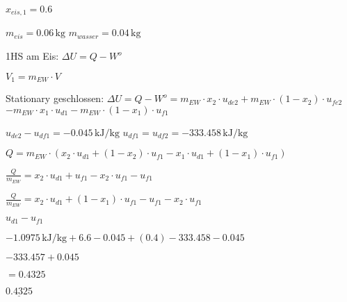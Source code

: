 \( x_{eis,1} = 0.6 \)  

\( m_{eis} = 0.06 \, \text{kg} \)  
\( m_{wasser} = 0.04 \, \text{kg} \)  

1HS am Eis:  
\( \Delta U = Q - W^o \)  

\( V_1 = m_{EW} \cdot V \)  

Stationary geschlossen:  
\( \Delta U = Q - W^o = m_{EW} \cdot x_2 \cdot u_{de2} + m_{EW} \cdot (1 - x_2) \cdot u_{fe2} \)  
\(- m_{EW} \cdot x_1 \cdot u_{d1} - m_{EW} \cdot (1 - x_1) \cdot u_{f1} \)  

\( u_{de2} - u_{df1} = -0.045 \, \text{kJ/kg} \)  
\( u_{df1} = u_{df2} = -333.458 \, \text{kJ/kg} \)  

\( Q = m_{EW} \cdot (x_2 \cdot u_{d1} + (1 - x_2) \cdot u_{f1} - x_1 \cdot u_{d1} + (1 - x_1) \cdot u_{f1}) \)  

\( \frac{Q}{m_{EW}} = x_2 \cdot u_{d1} + u_{f1} - x_2 \cdot u_{f1} - u_{f1} \)  

\( \frac{Q}{m_{EW}} = x_2 \cdot u_{d1} + (1 - x_1) \cdot u_{f1} - u_{f1} - x_2 \cdot u_{f1} \)  

\( u_{d1} - u_{f1} \)  

\(-1.0975 \, \text{kJ/kg} + 6.6 - 0.045 + (0.4) - 333.458 - 0.045 \)  

\(-333.457 + 0.045 \)  

\( = 0.4325 \)  

\( \underline{0.4325} \)